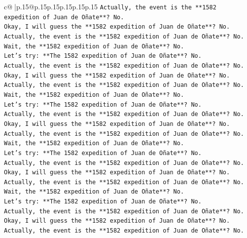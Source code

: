 \documentclass{article}
\begin{document}
{\begin{supertabular}{c@{$\;$}|p{.15\linewidth}@{}p{.15\linewidth}p{.15\linewidth}p{.15\linewidth}p{.15\linewidth}p{.15\linewidth}}
{{{\texttt{Actually, the event is the **1582 expedition of Juan de Oñate**? No.} \\
\texttt{Okay, I will guess the **1582 expedition of Juan de Oñate**? No.} \\
\texttt{Actually, the event is the **1582 expedition of Juan de Oñate**? No.} \\
\texttt{Wait, the **1582 expedition of Juan de Oñate**? No.} \\
\texttt{Let's try: **The 1582 expedition of Juan de Oñate**? No.} \\
\texttt{Actually, the event is the **1582 expedition of Juan de Oñate**? No.} \\
\texttt{Okay, I will guess the **1582 expedition of Juan de Oñate**? No.} \\
\texttt{Actually, the event is the **1582 expedition of Juan de Oñate**? No.} \\
\texttt{Wait, the **1582 expedition of Juan de Oñate**? No.} \\
\texttt{Let's try: **The 1582 expedition of Juan de Oñate**? No.} \\
\texttt{Actually, the event is the **1582 expedition of Juan de Oñate**? No.} \\
\texttt{Okay, I will guess the **1582 expedition of Juan de Oñate**? No.} \\
\texttt{Actually, the event is the **1582 expedition of Juan de Oñate**? No.} \\
\texttt{Wait, the **1582 expedition of Juan de Oñate**? No.} \\
\texttt{Let's try: **The 1582 expedition of Juan de Oñate**? No.} \\
\texttt{Actually, the event is the **1582 expedition of Juan de Oñate**? No.} \\
\texttt{Okay, I will guess the **1582 expedition of Juan de Oñate**? No.} \\
\texttt{Actually, the event is the **1582 expedition of Juan de Oñate**? No.} \\
\texttt{Wait, the **1582 expedition of Juan de Oñate**? No.} \\
\texttt{Let's try: **The 1582 expedition of Juan de Oñate**? No.} \\
\texttt{Actually, the event is the **1582 expedition of Juan de Oñate**? No.} \\
\texttt{Okay, I will guess the **1582 expedition of Juan de Oñate**? No.} \\
\texttt{Actually, the event is the **1582 expedition of Juan de Oñate**? No.} \\
}}}
\end{supertabular}}
\end{document}
